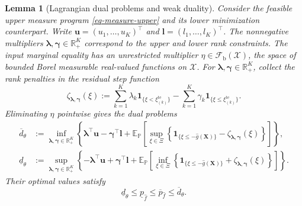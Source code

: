 \documentclass[review,11pt,3p,authoryear,nopreprintline]{elsarticle}
\newtheorem{lemma}{Lemma}
\begin{document}
\begin{lemma}[Lagrangian dual problems and weak duality]
  \label{lem-weak-duality}
  Consider the feasible upper measure program \eqref{eq-measure-upper} and its lower minimization counterpart. Write $\bm u=(u_1,\ldots,u_K)^\top$ and $\bm l=(l_1,\ldots,l_K)^\top$. The nonnegative multipliers $\bm\lambda,\bm\gamma\in\mathbb R_+^K$ correspond to the upper and lower rank constraints. The input marginal equality has an unrestricted multiplier $\eta\in\mathcal F_{\mathrm b}(\mathcal X)$, the space of bounded Borel measurable real-valued functions on $\mathcal X$. For $\bm\lambda,\bm\gamma\in\mathbb R_+^K$, collect the rank penalties in the residual step function
  \begin{equation}
    \zeta_{\bm\lambda,\bm\gamma}(\xi)
    :=\sum_{k=1}^K\lambda_k\mathbf1_{\{\xi<\xi_{(k)}^{\mathrm{te}}\}}
      -\sum_{k=1}^K\gamma_k\mathbf1_{\{\xi\le\xi_{(k)}^{\mathrm{te}}\}}.
    \label{eq-dual-step-function}
  \end{equation}
  Eliminating $\eta$ pointwise gives the dual problems
  \begin{align}
    \overline d_\theta
    &:=\inf_{\bm\lambda,\bm\gamma\in\mathbb R_+^K}
    \left\{\bm\lambda^\top\bm u-\bm\gamma^\top\bm l
    +\mathbb E_{\mathbb P}\left[\sup_{\xi\in\Xi}\left\{
    \mathbf1_{\{\xi\le-\hat g(\bm X)\}}
    -\zeta_{\bm\lambda,\bm\gamma}(\xi)
    \right\}\right]\right\},
    \label{eq-upper-measure-dual}\\
    \underline d_\theta
    &:=\sup_{\bm\lambda,\bm\gamma\in\mathbb R_+^K}
    \left\{-\bm\lambda^\top\bm u+\bm\gamma^\top\bm l
    +\mathbb E_{\mathbb P}\left[\inf_{\xi\in\Xi}\left\{
    \mathbf1_{\{\xi\le-\hat g(\bm X)\}}
    +\zeta_{\bm\lambda,\bm\gamma}(\xi)
    \right\}\right]\right\}.
    \label{eq-lower-measure-dual}
  \end{align}
  Their optimal values satisfy
  \begin{equation}
    \underline d_\theta\le\underline p_{\hat f}
    \le\overline p_{\hat f}\le\overline d_\theta.
    \label{eq-weak-duality}
  \end{equation}
\end{lemma}
\end{document}
